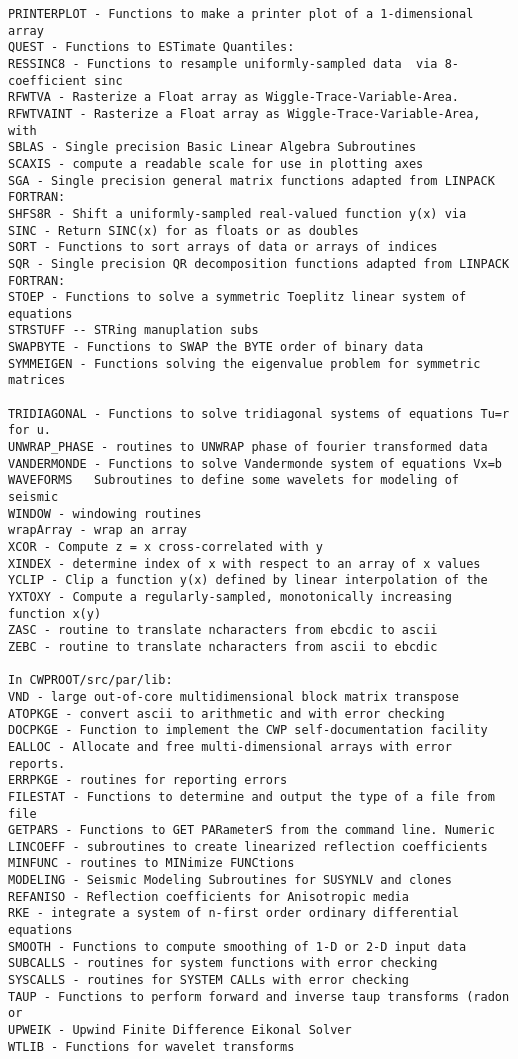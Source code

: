 {{\begin{verbatim}
PRINTERPLOT - Functions to make a printer plot of a 1-dimensional array
QUEST - Functions to ESTimate Quantiles:
RESSINC8 - Functions to resample uniformly-sampled data  via 8-coefficient sinc
RFWTVA - Rasterize a Float array as Wiggle-Trace-Variable-Area.
RFWTVAINT - Rasterize a Float array as Wiggle-Trace-Variable-Area, with
SBLAS - Single precision Basic Linear Algebra Subroutines
SCAXIS - compute a readable scale for use in plotting axes
SGA - Single precision general matrix functions adapted from LINPACK FORTRAN:
SHFS8R - Shift a uniformly-sampled real-valued function y(x) via
SINC - Return SINC(x) for as floats or as doubles
SORT - Functions to sort arrays of data or arrays of indices
SQR - Single precision QR decomposition functions adapted from LINPACK FORTRAN:
STOEP - Functions to solve a symmetric Toeplitz linear system of equations
STRSTUFF -- STRing manuplation subs
SWAPBYTE - Functions to SWAP the BYTE order of binary data 
SYMMEIGEN - Functions solving the eigenvalue problem for symmetric matrices

TRIDIAGONAL - Functions to solve tridiagonal systems of equations Tu=r for u.
UNWRAP_PHASE - routines to UNWRAP phase of fourier transformed data
VANDERMONDE - Functions to solve Vandermonde system of equations Vx=b 
WAVEFORMS   Subroutines to define some wavelets for modeling of seismic
WINDOW - windowing routines
wrapArray - wrap an array
XCOR - Compute z = x cross-correlated with y
XINDEX - determine index of x with respect to an array of x values
YCLIP - Clip a function y(x) defined by linear interpolation of the
YXTOXY - Compute a regularly-sampled, monotonically increasing function x(y)
ZASC - routine to translate ncharacters from ebcdic to ascii
ZEBC - routine to translate ncharacters from ascii to ebcdic

In CWPROOT/src/par/lib:
VND - large out-of-core multidimensional block matrix transpose
ATOPKGE - convert ascii to arithmetic and with error checking
DOCPKGE - Function to implement the CWP self-documentation facility
EALLOC - Allocate and free multi-dimensional arrays with error reports.
ERRPKGE - routines for reporting errors
FILESTAT - Functions to determine and output the type of a file from file
GETPARS - Functions to GET PARameterS from the command line. Numeric
LINCOEFF - subroutines to create linearized reflection coefficients
MINFUNC - routines to MINimize FUNCtions
MODELING - Seismic Modeling Subroutines for SUSYNLV and clones
REFANISO - Reflection coefficients for Anisotropic media
RKE - integrate a system of n-first order ordinary differential equations
SMOOTH - Functions to compute smoothing of 1-D or 2-D input data
SUBCALLS - routines for system functions with error checking
SYSCALLS - routines for SYSTEM CALLs with error checking
TAUP - Functions to perform forward and inverse taup transforms (radon or
UPWEIK - Upwind Finite Difference Eikonal Solver
WTLIB - Functions for wavelet transforms


\end{verbatim}}}
